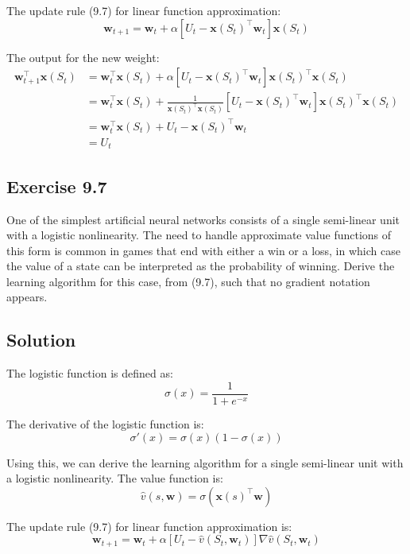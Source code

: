 The update rule (9.7) for linear function approximation: 
\[
    \mathbf{w}_{t+1} = \mathbf{w}_t + \alpha \left[ U_t - \mathbf{x}(S_t)^\top \mathbf{w}_t \right] \mathbf{x}(S_t)
\]

The output for the new weight:
\begin{align*}
    \mathbf{w}_{t+1}^\top \mathbf{x}(S_t) &= \mathbf{w}_t^\top \mathbf{x}(S_t) + \alpha \left[ U_t - \mathbf{x}(S_t)^\top \mathbf{w}_t \right] \mathbf{x}(S_t)^\top \mathbf{x}(S_t) \\
    &= \mathbf{w}_t^\top \mathbf{x}(S_t) + \frac{1}{\mathbf{x}(S_t)^\top \mathbf{x}(S_t)} \left[ U_t - \mathbf{x}(S_t)^\top \mathbf{w}_t \right] \mathbf{x}(S_t)^\top \mathbf{x}(S_t)  \\
    &= \mathbf{w}_t^\top \mathbf{x}(S_t) + U_t - \mathbf{x}(S_t)^\top \mathbf{w}_t \\
    &= U_t
\end{align*}


\subsection*{Exercise 9.7}

One of the simplest artificial neural networks consists of a single semi-linear
unit with a logistic nonlinearity. The need to handle approximate value functions of this
form is common in games that end with either a win or a loss, in which case the value of
a state can be interpreted as the probability of winning. Derive the learning algorithm
for this case, from (9.7), such that no gradient notation appears.

\subsection*{Solution}


The logistic function is defined as:
\[
    \sigma(x) = \frac{1}{1 + e^{-x}}
\]

The derivative of the logistic function is:
\[
    \sigma'(x) = \sigma(x) (1 - \sigma(x))
\]

Using this, we can derive the learning algorithm for a single semi-linear unit with a logistic nonlinearity. The value function is:
\[
    \hat{v}(s, \mathbf{w}) = \sigma(\mathbf{x}(s)^\top \mathbf{w})
\]

The update rule (9.7) for linear function approximation is:
\[
    \mathbf{w}_{t+1} = \mathbf{w}_t + \alpha \left[ U_t - \hat{v}(S_t, \mathbf{w}_t) \right] \nabla \hat{v}(S_t, \mathbf{w}_t)
\]

